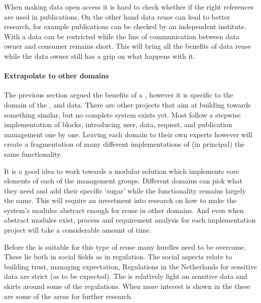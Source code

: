 When making data open access it is hard to check whether if the right references are used in publications.
On the other hand data reuse can lead to better research, for example publications can be checked by an independent institute.
With a \ivfsystem{} data can be restricted while the line of communication between data owner and consumer remains short.
This will bring all the benefits of data reuse while the data owner still has a grip on what happens with it.


\paragraph{Extrapolate to other domains}

The previous section argued the benefits of a \ivfsystem{}, however it is specific to the domain of the \projectdata{}, \ie{} \IVF{} and \PRN{} data.
There are other projects that aim at building towards something similar, but no complete system exists yet. 
Most follow a stepwise implementation of blocks, introducing user, data, request, and publication management one by one.
Leaving each domain to their own experts however will create a fragmentation of many different implementations of (in principal) the same functionality.

It is a good idea to work towards a modular solution which implements core elements of each of the management groups.
Different domains can pick what they need and add their specific `sugar' while the functionality remains largely the same.
This will require an investment into research on how to make the system's modules abstract enough for reuse in other domains.
And even when abstract modules exist, process and requirement analysis for each implementation project will take a considerable amount of time.

Before the \ivfsystem{} is suitable for this type of reuse many hurdles need to be overcome.
These lie both in social fields as in regulation.
The social aspects relate to building trust, managing expectation, 
Regulations in the Netherlands for sensitive data are strict (as to be expected).
The \projectdata{} is relatively light on sensitive data and skirts around some of the regulations.
When more interest is shown in the \ivfsystem{} these  are some of the areas for further research.

